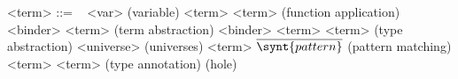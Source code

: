 \documentclass[preview]{standalone}
\begin{document}
\phantom{A}
\begin{grammar}%
<term> ::= \ %
\alt <var>                                                               \hfill (variable)
\alt <term> <term>                                                       \hfill (function application)
\alt {} <binder>  <term>                         \hfill (term abstraction)
\alt {} <binder> \coqinline{:} <term>
   <term> \hfill (type abstraction)
\alt <universe>                                                          \hfill (universes)
\alt {} <term> 
  $\overline{ \synt{pattern} }$  \hfill (pattern matching)
\alt <term> \coqinline{:} <term>                                         \hfill (type annotation)
\alt \coqinline{_}                                                       \hfill (hole)
%
%
%
\end{grammar}
\phantom{A}
\end{document}
